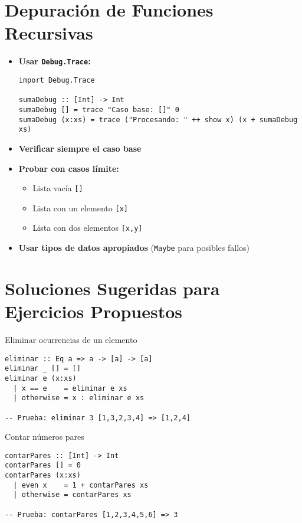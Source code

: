 \documentclass[12pt]{article}
\begin{document}
\section*{Depuración de Funciones Recursivas}
\begin{itemize}
  \item \textbf{Usar \texttt{Debug.Trace}:}
\begin{lstlisting}
import Debug.Trace

sumaDebug :: [Int] -> Int
sumaDebug [] = trace "Caso base: []" 0
sumaDebug (x:xs) = trace ("Procesando: " ++ show x) (x + sumaDebug xs)
\end{lstlisting}

  \item \textbf{Verificar siempre el caso base}
  \item \textbf{Probar con casos límite:}
    \begin{itemize}
      \item Lista vacía \texttt{[]}
      \item Lista con un elemento \texttt{[x]}
      \item Lista con dos elementos \texttt{[x,y]}
    \end{itemize}
  \item \textbf{Usar tipos de datos apropiados} (\texttt{Maybe} para posibles fallos)
\end{itemize}

\section*{Soluciones Sugeridas para Ejercicios Propuestos}

\begin{solucion}{Eliminar ocurrencias de un elemento}
\begin{lstlisting}
eliminar :: Eq a => a -> [a] -> [a]
eliminar _ [] = []
eliminar e (x:xs)
  | x == e    = eliminar e xs
  | otherwise = x : eliminar e xs

-- Prueba: eliminar 3 [1,3,2,3,4] => [1,2,4]
\end{lstlisting}
\end{solucion}

\begin{solucion}{Contar números pares}
\begin{lstlisting}
contarPares :: [Int] -> Int
contarPares [] = 0
contarPares (x:xs)
  | even x    = 1 + contarPares xs
  | otherwise = contarPares xs

-- Prueba: contarPares [1,2,3,4,5,6] => 3
\end{lstlisting}
\end{solucion}
\end{document}
